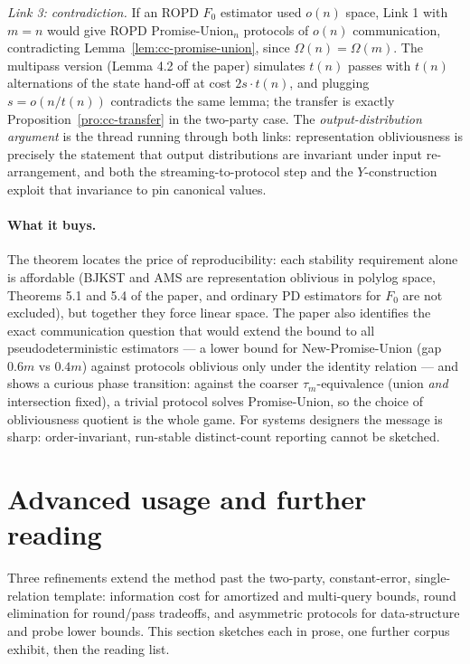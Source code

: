 \emph{Link 3: contradiction.} If an ROPD $F_0$ estimator used $o(n)$ space, Link 1
with $m = n$ would give ROPD Promise-Union$_n$ protocols of $o(n)$ communication,
contradicting Lemma~\ref{lem:cc-promise-union}, since $\Omega(n) = \Omega(m)$. The
multipass version (Lemma 4.2 of the paper) simulates $t(n)$ passes with $t(n)$
alternations of the state hand-off at cost $2s \cdot t(n)$, and plugging
$s = o(n/t(n))$ contradicts the same lemma; the transfer is exactly
Proposition~\ref{pro:cc-transfer} in the two-party case. The
\emph{output-distribution argument} is the thread running through both links:
representation obliviousness is precisely the statement that output distributions
are invariant under input re-arrangement, and both the streaming-to-protocol step
and the $Y$-construction exploit that invariance to pin canonical values.

\paragraph{What it buys.}
The theorem locates the price of reproducibility: each stability requirement alone
is affordable (BJKST and AMS are representation oblivious in polylog space,
Theorems 5.1 and 5.4 of the paper, and ordinary PD estimators for $F_0$ are not
excluded), but together they force linear space. The paper also identifies the exact
communication question that would extend the bound to all pseudodeterministic
estimators --- a lower bound for New-Promise-Union (gap $0.6m$ vs $0.4m$) against
protocols oblivious only under the identity relation --- and shows a curious phase
transition: against the coarser $\tau_m$-equivalence (union \emph{and} intersection
fixed), a trivial protocol solves Promise-Union, so the choice of obliviousness
quotient is the whole game. For systems designers the message is sharp:
order-invariant, run-stable distinct-count reporting cannot be sketched.

\section{Advanced usage and further reading}
\label{sec:cc-advanced}

Three refinements extend the method past the two-party, constant-error,
single-relation template: information cost for amortized and multi-query bounds,
round elimination for round/pass tradeoffs, and asymmetric protocols for
data-structure and probe lower bounds. This section sketches each in prose, one
further corpus exhibit, then the reading list.

